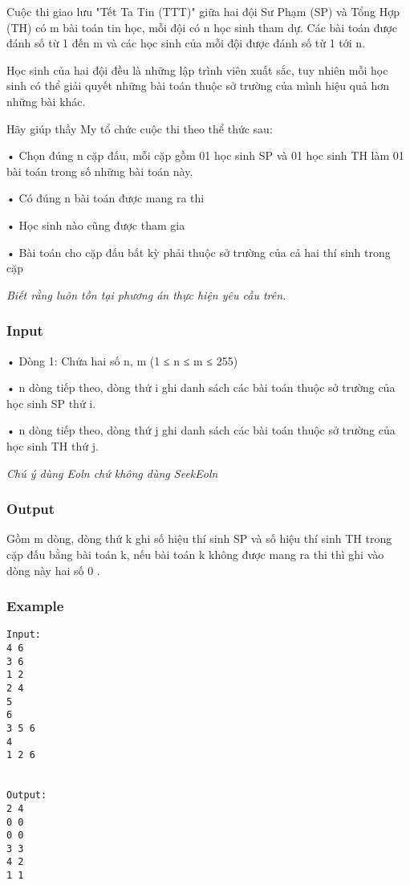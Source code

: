 



   Cuộc thi giao lưu "Tết Ta Tin (TTT)" giữa hai đội Sư Phạm (SP) và Tổng Hợp (TH) có m bài toán tin học, mỗi đội có n học sinh tham dự. Các bài toán được đánh số từ 1 đến m và các học sinh của mỗi đội được đánh số từ 1 tới n.   


   Học sinh của hai đội đều là những lập trình viên xuất sắc, tuy nhiên mỗi học sinh có thể giải quyết những bài toán thuộc sở trường của mình hiệu quả hơn những bài khác.   





   Hãy giúp thầy My tổ chức cuộc thi theo thể thức sau:   


   • Chọn đúng n cặp đấu, mỗi cặp gồm 01 học sinh SP và 01 học sinh TH làm 01 bài toán trong số những bài toán này.   


   • Có đúng n bài toán được mang ra thi   


   • Học sinh nào cũng được tham gia   


   • Bài toán cho cặp đấu bất kỳ phải thuộc sở trường của cả hai thí sinh trong cặp   





\textit{    Biết rằng luôn tồn tại phương án thực hiện yêu cầu trên.   }

\subsubsection{   Input  }

   • Dòng 1: Chứa hai số n, m (1 ≤ n ≤ m ≤ 255)   


   • n dòng tiếp theo, dòng thứ i ghi danh sách các bài toán thuộc sở trường của học sinh SP thứ i.   


   • n dòng tiếp theo, dòng thứ j ghi danh sách các bài toán thuộc sở trường của học sinh TH thứ j.   


\textit{    Chú ý dùng         Eoln        chứ không dùng         SeekEoln       }




\subsubsection{   Output  }

   Gồm m dòng, dòng thứ k ghi số hiệu thí sinh SP và số hiệu thí sinh TH trong cặp đấu bằng bài toán k, nếu bài toán k không được mang ra thi thì ghi vào dòng này hai số 0 .  

\subsubsection{   Example  }
\begin{verbatim}
Input:
4 6
3 6
1 2
2 4
5
6
3 5 6
4
1 2 6


Output:
2 4
0 0
0 0
3 3
4 2
1 1

\end{verbatim}
